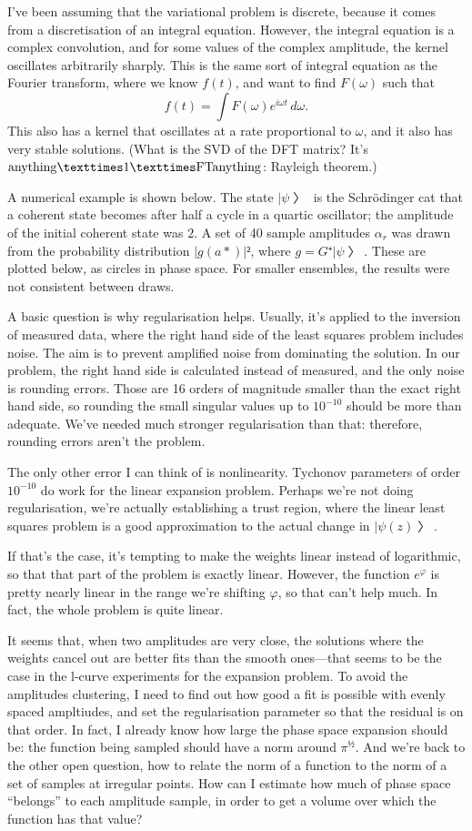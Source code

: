 I've been assuming that the variational problem is discrete, because it comes from a discretisation of an integral equation.  However, the integral equation is a complex convolution, and for some values of the complex amplitude, the kernel oscillates arbitrarily sharply.  This is the same sort of integral equation as the Fourier transform, where we know $f(t)$, and want to find $F(ω)$ such that
$$f(t)=\int F(ω)e^{iωt}\,dω.$$
This also has a kernel that oscillates at a rate proportional to $ω$, and it also has very stable solutions.  (What is the SVD of the DFT matrix?  It's ${\rm anything}×1×{\rm FT anything}$: Rayleigh theorem.)

A numerical example is shown below.  The state $|ψ〉$ is the Schrödinger cat that a coherent state becomes after half a cycle in a quartic oscillator; the amplitude of the initial coherent state was $2$.  A set of 40 sample amplitudes $α_r$ was drawn from the probability distribution $|g(a*)|²$, where $g=G⁺|ψ〉$.  These are plotted below, as circles in phase space.  For smaller ensembles, the results were not consistent between draws.

A basic question is why regularisation helps.  Usually, it's applied to the inversion of measured data, where the right hand side of the least squares problem includes noise.  The aim is to prevent amplified noise from dominating the solution.  In our problem, the right hand side is calculated instead of measured, and the only noise is rounding errors.  Those are 16 orders of magnitude smaller than the exact right hand side, so rounding the small singular values up to $10^{-10}$ should be more than adequate.  We've needed much stronger regularisation than that: therefore, rounding errors aren't the problem.

The only other error I can think of is nonlinearity.  Tychonov parameters of order $10^{-10}$ do work for the linear expansion problem.  Perhaps we're not doing regularisation, we're actually establishing a trust region, where the linear least squares problem is a good approximation to the actual change in $|ψ(z)〉$.

If that's the case, it's tempting to make the weights linear instead of logarithmic, so that that part of the problem is exactly linear.  However, the function $e^φ$ is pretty nearly linear in the range we're shifting $φ$, so that can't help much.  In fact, the whole problem is quite linear.

It seems that, when two amplitudes are very close, the solutions where the weights cancel out are better fits than the smooth ones—that seems to be the case in the l-curve experiments for the expansion problem.  To avoid the amplitudes clustering, I need to find out how good a fit is possible with evenly spaced ampltiudes, and set the regularisation parameter so that the residual is on that order.  In fact, I already know how large the phase space expansion should be: the function being sampled should have a norm around $π^½$.  And we're back to the other open question, how to relate the norm of a function to the norm of a set of samples at irregular points.  How can I estimate how much of phase space “belongs” to each amplitude sample, in order to get a volume over which the function has that value?

